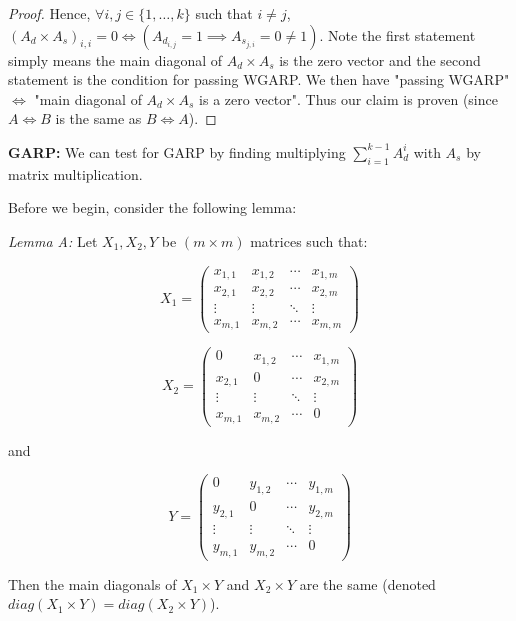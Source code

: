 \documentclass{article} %
\begin{document}
\begin{proof}
Hence, $\forall i, j\in\{1,\ldots,k\}$ such that $i\not=j$, $(A_d\times A_s)_{i,i}=0 \iff (A_{d_{i,j}}=1 \implies A_{s_{j,i}}=0\not=1)$. Note the first statement simply means the main diagonal of $A_d\times A_s$ is the zero vector and the second statement is the condition for passing WGARP. We then have "passing WGARP" $\iff$ "main diagonal of $A_d\times A_s$ is a zero vector". Thus our claim is proven (since $A\iff B$ is the same as $B\iff A$).
\end{proof}

\textbf{GARP:} We can test for GARP by finding multiplying $\sum_{i=1}^{k-1}A_{d}^{i}$ with $A_s$ by matrix multiplication.


Before we begin, consider the following lemma:


\textit{Lemma A:} Let $X_1, X_2, Y$ be $(m\times m)$ matrices such that:

\begin{minipage}{.5\linewidth}
\[
X_1 =
 \begin{pmatrix}
  x_{1,1} & x_{1,2} & \cdots & x_{1,m} \\
  x_{2,1} & x_{2,2} & \cdots & x_{2,m} \\
  \vdots  & \vdots  & \ddots & \vdots  \\
  x_{m,1} & x_{m,2} & \cdots & x_{m,m}
 \end{pmatrix}
\]
\end{minipage}
\begin{minipage}{.5\linewidth}
\[
X_2 =
 \begin{pmatrix}
  0 & x_{1,2} & \cdots & x_{1,m} \\
  x_{2,1} & 0 & \cdots & x_{2,m} \\
  \vdots  & \vdots  & \ddots & \vdots  \\
  x_{m,1} & x_{m,2} & \cdots & 0
 \end{pmatrix}
\]
\end{minipage}
and 

\[
Y =
 \begin{pmatrix}
  0 & y_{1,2} & \cdots & y_{1,m} \\
  y_{2,1} & 0 & \cdots & y_{2,m} \\
  \vdots  & \vdots  & \ddots & \vdots  \\
  y_{m,1} & y_{m,2} & \cdots & 0
 \end{pmatrix}
\]

Then the main diagonals of $X_1\times Y$ and $X_2\times Y$ are the same (denoted $diag(X_1\times Y)=diag(X_2\times Y)$).
\end{document}
